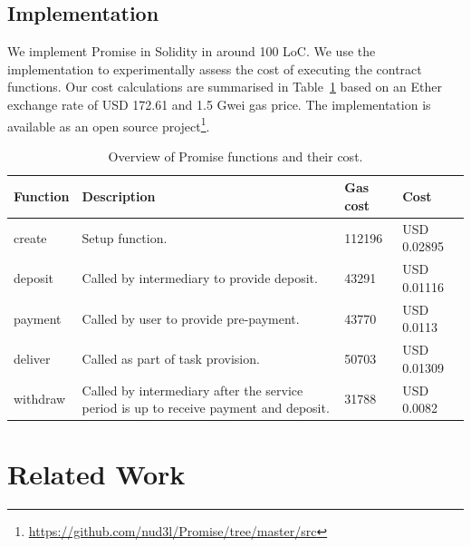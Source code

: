 \documentclass[runningheads]{llncs}
\newcommand{\sys}{Promise\xspace}
\begin{document}


\subsection{Implementation}

We implement \sys in Solidity in around 100 LoC.
We use the implementation to experimentally assess the cost of executing the contract functions.
Our cost calculations are summarised in Table~\ref{tab:implementation} based on an Ether exchange rate of USD 172.61 and 1.5 Gwei gas price.
The implementation is available as an open source project\footnote{\url{https://github.com/nud3l/Promise/tree/master/src}}.

\begin{table}[h]
\centering
\caption{Overview of \sys functions and their cost.}
\label{tab:implementation}
\begin{tabularx}{\textwidth}{lXll}
\toprule 
\textbf{Function} & \textbf{Description} & \textbf{Gas cost} & \textbf{Cost} \\ \toprule
create & Setup function. & 112196 & USD 0.02895 \\ 
deposit & Called by intermediary to provide deposit. & 43291 & USD 0.01116 \\
payment & Called by user to provide pre-payment. & 43770 & USD 0.0113 \\ \midrule
deliver & Called as part of task provision. & 50703 & USD 0.01309 \\ \midrule
withdraw & Called by intermediary after the service period is up to receive payment and deposit. & 31788 & USD 0.0082 \\
\bottomrule
\end{tabularx}
\end{table}




\section{Related Work}
\label{sec:related}
\end{document}
